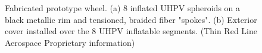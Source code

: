 \documentclass{article}
\begin{document}
\begin{figure}[hbt!]
    \centering
    \begin{minipage}{0.35\textwidth}
        \centering
    \end{minipage}
    \begin{minipage}{0.6\textwidth}
        \centering
    \end{minipage}
    \caption{Fabricated prototype wheel. (a) 8 inflated UHPV spheroids on a black metallic rim and tensioned, braided fiber "spokes". (b) Exterior cover installed over the 8 UHPV inflatable segments. (Thin Red Line Aerospace Proprietary information)}
    \label{tire_prototype}
\end{figure}
\end{document}
